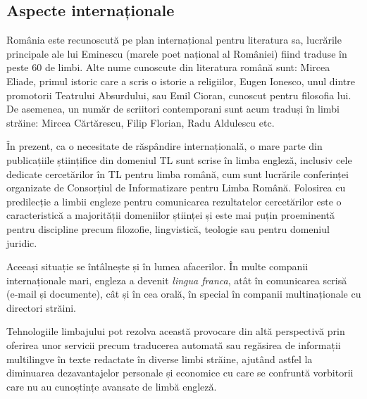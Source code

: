 \begin{multicols}{2}
\subsection{Aspecte internaționale}

România este recunoscută pe plan internațional pentru literatura sa, lucrările principale ale lui Eminescu (marele poet național al României) fiind traduse în peste 60 de limbi. Alte nume cunoscute din literatura română sunt: Mircea Eliade, primul istoric care a scris o istorie a religiilor, Eugen Ionesco, unul dintre promotorii Teatrului Absurdului, sau Emil Cioran, cunoscut pentru filosofia lui. De asemenea, un număr de scriitori contemporani sunt acum traduși în limbi străine: Mircea Cărtărescu, Filip Florian, Radu Aldulescu etc.

În prezent, ca o necesitate de răspândire internațională, o mare parte din publicațiile științifice din domeniul TL sunt scrise în limba engleză, inclusiv cele dedicate cercetărilor în TL pentru limba română, cum sunt lucrările conferinței organizate de Consorțiul de Informatizare pentru Limba Română. Folosirea cu predilecție a limbii engleze pentru comunicarea rezultatelor cercetărilor este o caracteristică a majorității domeniilor științei și este mai puțin proeminentă pentru discipline precum filozofie, lingvistică, teologie sau pentru domeniul juridic.



Aceeași situație se întâlnește și în lumea afacerilor. În multe companii internaționale mari, engleza a devenit \textit{lingua franca}, atât în comunicarea scrisă (e-mail și documente), cât și în cea orală, în special în companii multinaționale cu directori străini.

Tehnologiile limbajului pot rezolva această provocare din altă perspectivă prin oferirea unor servicii precum traducerea automată sau regăsirea de informații multilingve în texte redactate în diverse limbi străine, ajutând astfel la diminuarea dezavantajelor personale și economice cu care se confruntă vorbitorii care nu au cunoștințe avansate de limbă engleză.


\end{multicols}
